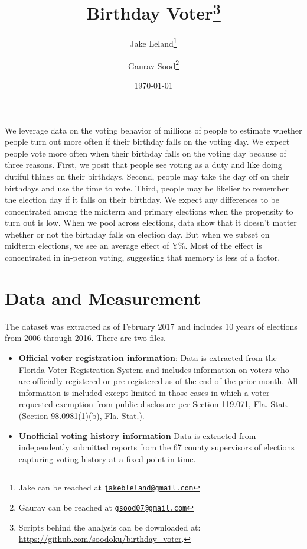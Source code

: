 \documentclass[12pt, letterpaper]{article}
\title{\Large{Birthday Voter}\footnote{Scripts behind the analysis can be downloaded at: \url{https://github.com/soodoku/birthday_voter}.}}
\author{Jake Leland\thanks{Jake can be reached at \href{mailto:jake.leland@utexas.edu}{\footnotesize{\texttt{jakebleland@gmail.com}}}}
\and Gaurav Sood\thanks{Gaurav can be reached at \href{mailto:gsood07@gmail.com}{\footnotesize{\texttt{gsood07@gmail.com}}}}}
\date{\vspace{.5cm}\normalsize{\today}}
\begin{document}
\maketitle

\begin{abstract}

\end{abstract}

\clearpage
\doublespacing
We leverage data on the voting behavior of millions of people to estimate whether people turn out more often if their birthday falls on the voting day. We expect people vote more often when their birthday falls on the voting day because of three reasons. First, we posit that people see voting as a duty and like doing dutiful things on their birthdays. Second, people may take the day off on their birthdays and use the time to vote. Third, people may be likelier to remember the election day if it falls on their birthday. We expect any differences to be concentrated among the midterm and primary elections when the propensity to turn out is low. When we pool across elections, data show that it doesn't matter whether or not the birthday falls on election day. But when we subset on midterm elections, we see an average effect of Y\%. Most of the effect is concentrated in in-person voting, suggesting that memory is less of a factor.

\section{Data and Measurement}
The dataset was extracted as of February 2017 and includes 10 years of elections from 2006 through 2016. There are two files.

\begin{itemize}
	\item \textbf{Official voter registration information}: Data is extracted from the Florida Voter Registration System and includes information on voters who are officially registered or pre-registered as of the end of the prior month. All information is included except limited in those cases in which a voter requested exemption from public disclosure per Section 119.071, Fla. Stat.  (Section 98.0981(1)(b), Fla. Stat.).

	\item \textbf{Unofficial voting history information} Data is extracted from independently submitted reports from the 67 county supervisors of elections capturing voting history at a fixed point in time. 
\end{itemize}
\end{document}
